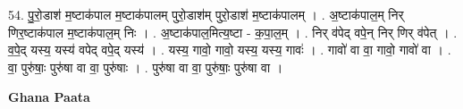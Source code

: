 \documentclass[17pt]{extarticle}
\begin{document}
54. पु॒रो॒डाश॑ म॒ष्टाक॑पाल म॒ष्टाक॑पालम् पुरो॒डाश॑म् पुरो॒डाश॑ म॒ष्टाक॑पालम् । . अ॒ष्टाक॑पाल॒म् निर् णिर॒ष्टाक॑पाल म॒ष्टाक॑पाल॒म् निः । . अ॒ष्टाक॑पाल॒मित्य॒ष्टा - क॒पा॒ल॒म् । . निर् व॑पेद् वपे॒न् निर् णिर् व॑पेत् । . व॒पे॒द् यस्य॒ यस्य॑ वपेद् वपे॒द् यस्य॑ । . यस्य॒ गावो॒ गावो॒ यस्य॒ यस्य॒ गावः॑ । . गावो॑ वा वा॒ गावो॒ गावो॑ वा । . वा॒ पुरु॑षाः॒ पुरु॑षा वा वा॒ पुरु॑षाः । . पुरु॑षा वा वा॒ पुरु॑षाः॒ पुरु॑षा वा । \newline

\textbf{Ghana Paata } \newline
\end{document}
